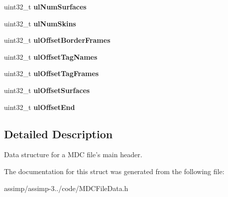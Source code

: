 \begin{DoxyCompactItemize}
\item 
\hypertarget{struct_assimp_1_1_m_d_c_1_1_header_a3a3416e662d9238aa63149deaabe0991}{uint32\+\_\+t {\bfseries ul\+Num\+Surfaces}}\label{struct_assimp_1_1_m_d_c_1_1_header_a3a3416e662d9238aa63149deaabe0991}

\item 
\hypertarget{struct_assimp_1_1_m_d_c_1_1_header_a3fdc0a122c9341e5e2bf2f95e58b4926}{uint32\+\_\+t {\bfseries ul\+Num\+Skins}}\label{struct_assimp_1_1_m_d_c_1_1_header_a3fdc0a122c9341e5e2bf2f95e58b4926}

\item 
\hypertarget{struct_assimp_1_1_m_d_c_1_1_header_a29da3e92ad8c29d8ad494a0b3f5ef7d6}{uint32\+\_\+t {\bfseries ul\+Offset\+Border\+Frames}}\label{struct_assimp_1_1_m_d_c_1_1_header_a29da3e92ad8c29d8ad494a0b3f5ef7d6}

\item 
\hypertarget{struct_assimp_1_1_m_d_c_1_1_header_a236e921dcf681c6de9d97086f7e02e69}{uint32\+\_\+t {\bfseries ul\+Offset\+Tag\+Names}}\label{struct_assimp_1_1_m_d_c_1_1_header_a236e921dcf681c6de9d97086f7e02e69}

\item 
\hypertarget{struct_assimp_1_1_m_d_c_1_1_header_a506d57f2d486f2addf4c37d51ae60d67}{uint32\+\_\+t {\bfseries ul\+Offset\+Tag\+Frames}}\label{struct_assimp_1_1_m_d_c_1_1_header_a506d57f2d486f2addf4c37d51ae60d67}

\item 
\hypertarget{struct_assimp_1_1_m_d_c_1_1_header_a07cb2122ba6cb156832cabca56ee6d89}{uint32\+\_\+t {\bfseries ul\+Offset\+Surfaces}}\label{struct_assimp_1_1_m_d_c_1_1_header_a07cb2122ba6cb156832cabca56ee6d89}

\item 
\hypertarget{struct_assimp_1_1_m_d_c_1_1_header_aa886fa9d48026b8d82c63bcbdd4f3124}{uint32\+\_\+t {\bfseries ul\+Offset\+End}}\label{struct_assimp_1_1_m_d_c_1_1_header_aa886fa9d48026b8d82c63bcbdd4f3124}

\end{DoxyCompactItemize}


\subsection{Detailed Description}
Data structure for a M\+D\+C file's main header. 

The documentation for this struct was generated from the following file\+:\begin{DoxyCompactItemize}
\item 
assimp/assimp-\/3../code/M\+D\+C\+File\+Data.\+h\end{DoxyCompactItemize}
